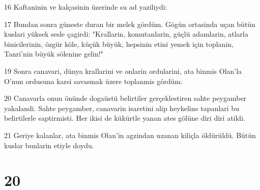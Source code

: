 \par 16 Kaftaninin ve kalçasinin üzerinde su ad yaziliydi:
\par 17 Bundan sonra güneste duran bir melek gördüm. Gögün ortasinda uçan bütün kuslari yüksek sesle çagirdi: "Krallarin, komutanlarin, güçlü adamlarin, atlarla binicilerinin, özgür köle, küçük büyük, hepsinin etini yemek için toplanin, Tanri'nin büyük sölenine gelin!"
\par 19 Sonra canavari, dünya krallarini ve onlarin ordularini, ata binmis Olan'la O'nun ordusuna karsi savasmak üzere toplanmis gördüm.
\par 20 Canavarla onun önünde dogaüstü belirtiler gerçeklestiren sahte peygamber yakalandi. Sahte peygamber, canavarin isaretini alip heykeline tapanlari bu belirtilerle saptirmisti. Her ikisi de kükürtle yanan ates gölüne diri diri atildi.
\par 21 Geriye kalanlar, ata binmis Olan'in agzindan uzanan kiliçla öldürüldü. Bütün kuslar bunlarin etiyle doydu.

\chapter{20}

